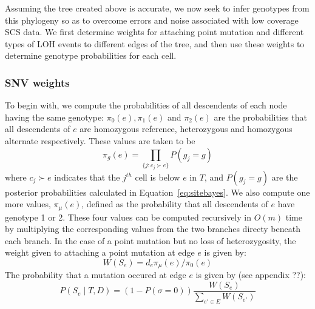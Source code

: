 \documentclass[../../main.tex]{subfiles}
\begin{document}
Assuming the tree created above is accurate, we now seek to infer genotypes from this phylogeny so as to overcome errors and noise associated with low coverage SCS data. We first determine weights for attaching point mutation and different types of LOH events to different edges of the tree, and then use these weights to determine genotype probabilities for each cell.
\subsubsection{SNV weights}
To begin with, we compute the probabilities of all descendents of each node having the same genotype: $\pi_0(e), \pi_1(e)$ and $\pi_2(e)$ are the probabilities that all descendents of $e$ are homozygous reference, heterozygous and homozygous alternate respectively. These values are taken to be
\begin{equation*}
\pi_g(e) = \prod_{\{j:c_j\succ e\}} P(g_j = g)
\end{equation*}
where $c_j\succ e$ indicates that the $j^{th}$ cell is below $e$ in $T$, and $P(g_j =g)$ are the posterior probabilities calculated in Equation~\eqref{eq:sitebayes}. We also compute one more values, $\pi_\mu(e)$, defined as the probability that all descendents of $e$ have genotype 1 or 2. These four values can be computed recursively in $O(m)$ time by multiplying the corresponding values from the two branches directy beneath each branch. In the case of a point mutation but no loss of heterozygosity, the weight given to attaching a point mutation at edge $e$ is given by:
\begin{equation} \label{eq:Wmu}
W(S_e) = d_e\pi_\mu(e)/\pi_0(e)
\end{equation}
The probability that a mutation occured at edge $e$ is given by (see appendix ??):
\begin{equation*}
P(S_e\mid T, D) = (1-P(\sigma=0))\frac{W(S_e)}{\sum_{e'\in E}W(S_{e'})}
\end{equation*}

\end{document}
